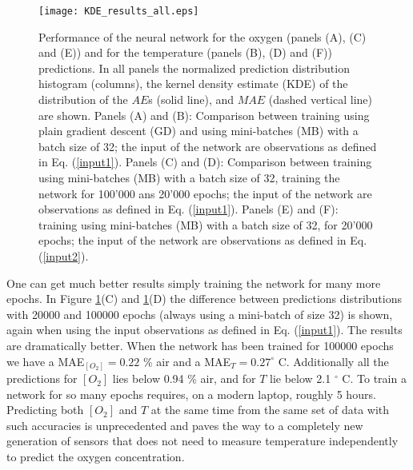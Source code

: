 \documentclass[9pt,twocolumn,twoside,pdftex]{optica}
\begin{document}
\begin{figure}[htbp]
\centering
\texttt{[image: KDE\_results\_all.eps]}
\caption{Performance of the neural network for the oxygen (panels (A), (C) and (E)) and for the temperature (panels (B), (D) and (F)) predictions. In all panels the normalized prediction distribution histogram (columns), the kernel density estimate (KDE) of the distribution of the $AE$s (solid line), and $MAE$ (dashed vertical line) are shown. Panels (A) and (B): Comparison between training using plain gradient descent (GD) and using mini-batches (MB) with a batch size of 32; the input of the network are observations as defined in Eq. (\ref{input1}). Panels (C) and (D): Comparison between training using mini-batches (MB) with a batch size of 32, training the network for 100'000 ans 20'000 epochs; the input of the network are observations as defined in Eq. (\ref{input1}). Panels (E) and (F): training using mini-batches (MB) with a batch size of 32, for 20'000 epochs; the input of the network are observations as defined in Eq. (\ref{input2}).}
\label{fig:KDE_results_all}
\end{figure}


One can get much better results simply training the network for many more epochs. In Figure \ref{fig:KDE_results_all}(C) and \ref{fig:KDE_results_all}(D) the difference between predictions distributions with 20000 and 100000 epochs (always using a mini-batch of size 32) is shown, again when using the input observations as defined in Eq. (\ref{input1}). The results are dramatically better. When the network has been trained for 100000 epochs we have a MAE$_{[O_2]}=0.22$ \% air and a MAE$_{T}=0.27^\circ$ C. Additionally all the predictions for $[O_2]$ lies below 0.94 \% air, and for $T$ lie below 2.1 $^\circ$ C. To train a network for so many epochs requires, on a modern laptop, roughly 5 hours. Predicting both $[O_2]$ and $T$ at the same time from the same set of data with such accuracies is unprecedented and paves the way to a completely new generation of sensors that does not need to measure temperature independently to predict the oxygen concentration.
\end{document}
